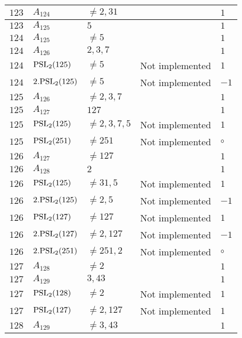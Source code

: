 \documentclass[a4paper, 11pt]{article}
\begin{document}
\begin{longtable}{lllll}
        $ 123 $ & $ A_{124} $ & $ \neq 2, 31 $ & $ ~ $ & $ 1  $ \\ \hline
        $ 123 $ & $ A_{125} $ & $ 5 $ & $ ~ $ & $ 1  $ \\ \hline
        $ 124 $ & $ A_{125} $ & $ \neq 5 $ & $ ~ $ & $ 1  $ \\ \hline
        $ 124 $ & $ A_{126} $ & $ 2, 3, 7 $ & $ ~ $ & $ 1  $ \\ \hline
        $ 124 $ & $ {\rm PSL}_{2}(125) $ & $ \neq 5 $ & Not implemented & $ 1  $ \\ \hline
        $ 124 $ & $ 2.{\rm PSL}_{2}(125) $ & $ \neq 5 $ & Not implemented & $ -1  $ \\ \hline
        $ 125 $ & $ A_{126} $ & $ \neq 2, 3, 7 $ & $ ~ $ & $ 1  $ \\ \hline
        $ 125 $ & $ A_{127} $ & $ 127 $ & $ ~ $ & $ 1  $ \\ \hline
        $ 125 $ & $ {\rm PSL}_{2}(125) $ & $ \neq 2, 3, 7, 5 $ & Not implemented & $ 1  $ \\ \hline
        $ 125 $ & $ {\rm PSL}_{2}(251) $ & $ \neq 251 $ & Not implemented & $\circ$ \\ \hline
        $ 126 $ & $ A_{127} $ & $ \neq 127 $ & $ ~ $ & $ 1  $ \\ \hline
        $ 126 $ & $ A_{128} $ & $ 2 $ & $ ~ $ & $ 1  $ \\ \hline
        $ 126 $ & $ {\rm PSL}_{2}(125) $ & $ \neq 31, 5 $ & Not implemented & $ 1  $ \\ \hline
        $ 126 $ & $ 2.{\rm PSL}_{2}(125) $ & $ \neq 2, 5 $ & Not implemented & $ -1  $ \\ \hline
        $ 126 $ & $ {\rm PSL}_{2}(127) $ & $ \neq 127 $ & Not implemented & $ 1  $ \\ \hline
        $ 126 $ & $ 2.{\rm PSL}_{2}(127) $ & $ \neq 2, 127 $ & Not implemented & $ -1  $ \\ \hline
        $ 126 $ & $ 2.{\rm PSL}_{2}(251) $ & $ \neq 251, 2 $ & Not implemented & $\circ$ \\ \hline
        $ 127 $ & $ A_{128} $ & $ \neq 2 $ & $ ~ $ & $ 1  $ \\ \hline
        $ 127 $ & $ A_{129} $ & $ 3, 43 $ & $ ~ $ & $ 1  $ \\ \hline
        $ 127 $ & $ {\rm PSL}_{2}(128) $ & $ \neq 2 $ & Not implemented & $ 1  $ \\ \hline
        $ 127 $ & $ {\rm PSL}_{2}(127) $ & $ \neq 2, 127 $ & Not implemented & $ 1  $ \\ \hline
        $ 128 $ & $ A_{129} $ & $ \neq 3, 43 $ & $ ~ $ & $ 1  $ \\ \hline

\end{longtable}
\end{document}
